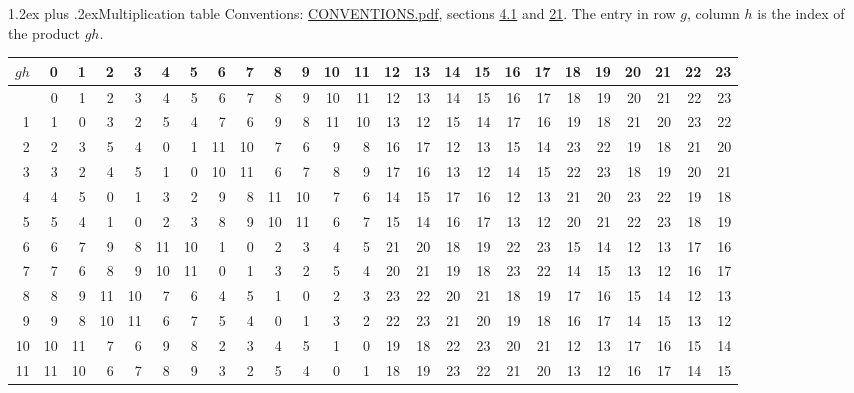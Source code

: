 \documentclass[10pt,a4paper]{article}
\makeatletter
\renewcommand\section{\@startsection{section}{1}{\z@}{-3ex plus -1ex minus -.2ex}%
  {1.2ex plus .2ex}{\normalfont\large\sffamily\bfseries\color{parttitle}}}
\numberwithin{equation}{section}
\makeatother
\begin{document}
\section{Multiplication table}\label{s:multiplication}
Conventions: \href{../../CONVENTIONS.pdf}{CONVENTIONS.pdf}, sections \href{../../../rotation/CONVENTIONS.pdf\#conv.4.1}{4.1} and \href{../../CONVENTIONS.pdf\#conv.21}{21}.
The entry in row $g$, column $h$ is the index of the product $gh$.
{\normalsize\setlength{\tabcolsep}{0.1em}\setlength{\LTleft}{-8pt plus 1fill}\setlength{\LTright}{-8pt plus 1fill}\begin{longtable}{@{}r|rrrrrrrrrrrrrrrrrrrrrrrr@{}}\toprule
$gh$ & 0 & 1 & 2 & 3 & 4 & 5 & 6 & 7 & 8 & 9 & 10 & 11 & 12 & 13 & 14 & 15 & 16 & 17 & 18 & 19 & 20 & 21 & 22 & 23\\\midrule\endhead
\bottomrule\endfoot\endlastfoot
0 & 0 & 1 & 2 & 3 & 4 & 5 & 6 & 7 & 8 & 9 & 10 & 11 & 12 & 13 & 14 & 15 & 16 & 17 & 18 & 19 & 20 & 21 & 22 & 23\\*
1 & 1 & 0 & 3 & 2 & 5 & 4 & 7 & 6 & 9 & 8 & 11 & 10 & 13 & 12 & 15 & 14 & 17 & 16 & 19 & 18 & 21 & 20 & 23 & 22\\
2 & 2 & 3 & 5 & 4 & 0 & 1 & 11 & 10 & 7 & 6 & 9 & 8 & 16 & 17 & 12 & 13 & 15 & 14 & 23 & 22 & 19 & 18 & 21 & 20\\
3 & 3 & 2 & 4 & 5 & 1 & 0 & 10 & 11 & 6 & 7 & 8 & 9 & 17 & 16 & 13 & 12 & 14 & 15 & 22 & 23 & 18 & 19 & 20 & 21\\
4 & 4 & 5 & 0 & 1 & 3 & 2 & 9 & 8 & 11 & 10 & 7 & 6 & 14 & 15 & 17 & 16 & 12 & 13 & 21 & 20 & 23 & 22 & 19 & 18\\
5 & 5 & 4 & 1 & 0 & 2 & 3 & 8 & 9 & 10 & 11 & 6 & 7 & 15 & 14 & 16 & 17 & 13 & 12 & 20 & 21 & 22 & 23 & 18 & 19\\
6 & 6 & 7 & 9 & 8 & 11 & 10 & 1 & 0 & 2 & 3 & 4 & 5 & 21 & 20 & 18 & 19 & 22 & 23 & 15 & 14 & 12 & 13 & 17 & 16\\
7 & 7 & 6 & 8 & 9 & 10 & 11 & 0 & 1 & 3 & 2 & 5 & 4 & 20 & 21 & 19 & 18 & 23 & 22 & 14 & 15 & 13 & 12 & 16 & 17\\
8 & 8 & 9 & 11 & 10 & 7 & 6 & 4 & 5 & 1 & 0 & 2 & 3 & 23 & 22 & 20 & 21 & 18 & 19 & 17 & 16 & 15 & 14 & 12 & 13\\
9 & 9 & 8 & 10 & 11 & 6 & 7 & 5 & 4 & 0 & 1 & 3 & 2 & 22 & 23 & 21 & 20 & 19 & 18 & 16 & 17 & 14 & 15 & 13 & 12\\
10 & 10 & 11 & 7 & 6 & 9 & 8 & 2 & 3 & 4 & 5 & 1 & 0 & 19 & 18 & 22 & 23 & 20 & 21 & 12 & 13 & 17 & 16 & 15 & 14\\
11 & 11 & 10 & 6 & 7 & 8 & 9 & 3 & 2 & 5 & 4 & 0 & 1 & 18 & 19 & 23 & 22 & 21 & 20 & 13 & 12 & 16 & 17 & 14 & 15\\

\end{longtable}}
\end{document}
